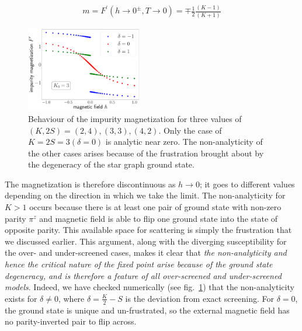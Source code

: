 \documentclass[reprint,prb,superscriptaddress]{revtex4-2}
\begin{document}
\begin{equation}\begin{aligned}
	m = F^\prime(h \to 0^\pm, T\to 0) = \mp \frac{1}{2}\frac{(K-1)}{(K+1)}
\end{aligned}\end{equation}
\begin{figure}[!htpb]
	\centering
	\includegraphics[width=0.45\textwidth]{plt/disc_mag_imp_gen.pdf}
	\caption{Behaviour of the impurity magnetization for three values of \(\left(K, 2S\right) = \left(2, 4\right), \left( 3,3 \right), \left(4, 2\right)  \). Only the case of \(K=2S=3 \left(\delta=0\right)\) is analytic near zero. The non-analyticity of the other cases arises because of the frustration brought about by the degeneracy of the star graph ground state.}
	\label{mag_crit}
\end{figure}

The magnetization is therefore discontinuous as \(h\to 0\); it goes to different values depending on the direction in which we take the limit. The non-analyticity for \(K>1\) occurs because there is at least one pair of ground state with non-zero parity \(\pi^z\) and magnetic field is able to flip one ground state into the state of opposite parity. This available space for scattering is simply the frustration that we discussed earlier. This argument, along with the diverging susceptibility for the over- and under-screened cases, makes it clear that \textit{the non-analyticity and hence the critical nature of the fixed point arise because of the ground state degeneracy, and is therefore a feature of all over-screened and under-screened  models}. Indeed, we have checked numerically (see fig.~\ref{mag_crit}) that the non-analyticity exists for \(\delta \neq 0\), where \(\delta = \frac{K}{2} - S\) is the deviation from exact screening. For \(\delta=0\), the ground state is unique and un-frustrated, so the external magnetic field has no parity-inverted pair to flip across.
\end{document}
